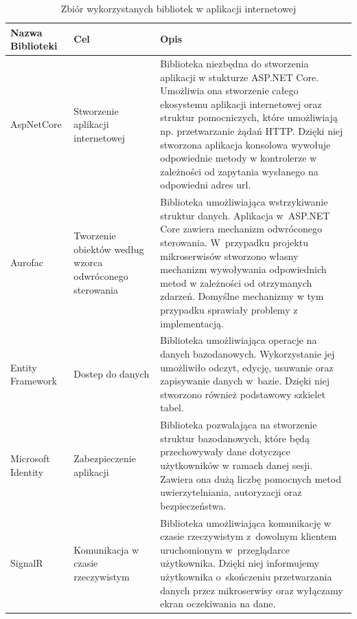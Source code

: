 \begin{center}
    \begin{longtable}{ | p{3.1cm} | p{4cm} | p{6.5cm} |}
   	\caption{Zbiór wykorzystanych bibliotek w aplikacji internetowej}
   	\label{librariesDotNet} \\
    \hline Nazwa \newline Biblioteki & Cel & Opis \\ \hline    
    
    \hline AspNetCore &
   			 Stworzenie aplikacji internetowej
   		
    & Biblioteka niezbędna do stworzenia aplikacji w stukturze ASP.NET Core. Umożliwia ona stworzenie całego ekosystemu aplikacji internetowej oraz struktur pomocniczych, które umożliwiają np. przetwarzanie żądań HTTP. Dzięki niej stworzona aplikacja konsolowa wywołuje odpowiednie metody w kontrolerze w zależności od zapytania wysłanego na odpowiedni adres url.\\ \hline
    
    \hline 
    Aurofac 
    & Tworzenie obiektów według wzorca odwróconego sterowania
    & Biblioteka umożliwiająca wstrzykiwanie struktur danych. Aplikacja w~ASP.NET Core zawiera mechanizm odwróconego sterowania. W~przypadku projektu mikroserwisów stworzono własny mechanizm wywoływania odpowiednich metod w zależności od otrzymanych zdarzeń. Domyślne mechanizmy w tym przypadku sprawiały problemy z implementacją.\\ \hline
    
    \hline Entity \newline Framework
    & Dostep do danych
    &  Biblioteka umożliwiająca operacje na danych bazodanowych. Wykorzystanie jej umożliwiło odczyt, edycję, usuwanie oraz zapisywanie danych w~bazie. Dzięki niej stworzono również podstawowy szkielet tabel.
    \\ \hline
    
    \hline Microsoft \newline Identity 
    & Zabezpieczenie \newline aplikacji
   	& Biblioteka pozwalająca na stworzenie struktur bazodanowych, które będą przechowywały dane dotyczące użytkowników w ramach danej sesji. Zawiera ona dużą liczbę pomocnych metod uwierzytelniania, autoryzacji oraz bezpieczeństwa. \\ \hline
    
    \hline SignalR 
    & Komunikacja w czasie rzeczywistym
    & Biblioteka umożliwiająca komunikację w czasie rzeczywistym z~dowolnym klientem uruchomionym w~przeglądarce użytkownika. Dzięki niej informujemy użytkownika o~skończeniu przetwarzania danych przez mikroserwisy oraz wyłączamy ekran oczekiwania na dane.\\ \hline
    

\end{longtable}
\end{center}
